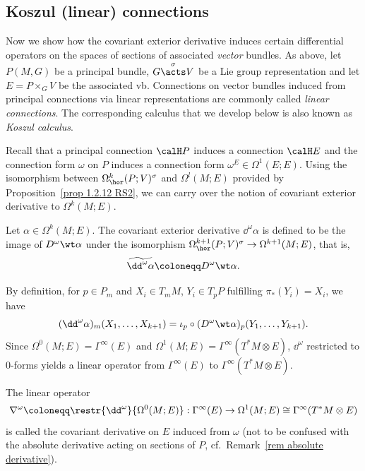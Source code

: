 \subsection{Koszul (linear) connections}

Now we show how the covariant exterior derivative induces certain differential operators on the spaces of sections of associated \emph{vector} bundles. As above, let $P(M,G)$ be a principal bundle, $G\overset{\sigma}{\acts}V$ be a Lie group representation and let $E=P\times_G V$ be the associated \gls{vb}. Connections on vector bundles induced from principal connections via linear representations are commonly called \emph{linear connections}. The corresponding calculus that we develop below is also known as \emph{Koszul calculus}.

Recall that a principal connection $\calH P$ induces a connection $\calH E$ and the connection form $\omega$ on $P$ induces a connection form $\omega^E\in \Omega^1(E;E)$. Using the isomorphism between $\Omega^k_{\hor}(P;V)^\sigma$ and $\Omega^l(M;E)$ provided by Proposition~\ref{prop 1.2.12 RS2}, we can carry over the notion of covariant exterior derivative to $\Omega^k(M;E)$.

\begin{defn}
    Let $\alpha\in\Omega^k(M;E)$. The covariant exterior derivative $\dd^\omega\alpha$ is defined to be the image of $D^\omega\wt\alpha$ under the isomorphism $\Omega^{k+1}_{\hor}(P;V)^\sigma\to \Omega^{k+1}(M;E)$, that is,
    \[\widetilde{\dd^\omega\alpha}\coloneqq D^\omega\wt\alpha.\]
\end{defn}

By definition, for $p\in P_m$ and $X_i\in T_mM$, $Y_i\in T_pP$ fulfilling $\pi_\ast(Y_i)=X_i$, we have
\[(\dd^\omega\alpha)_m(X_1,\ldots,X_{k+1})=\iota_p\circ(D^\omega\wt\alpha)_p(Y_1,\ldots,Y_{k+1}).\label{eq 1.5.2 RS2}\]
Since $\Omega^0(M;E)=\Gamma^\infty(E)$ and $\Omega^1(M;E)=\Gamma^\infty(T^\ast M\otimes E)$, $\dd^\omega$ restricted to $0$-forms yields a linear operator from $\Gamma^\infty(E)$ to $\Gamma^\infty(T^\ast M\otimes E)$.

\begin{defn}
    The linear operator
    \[\nabla^\omega\coloneqq \restr{\dd^\omega}{\Omega^0(M;E)}:\Gamma^\infty(E)\to \Omega^1(M;E)\cong\Gamma^\infty(T^\ast M\otimes E)\]
    is called the covariant derivative on $E$ induced from $\omega$ (not to be confused with the absolute derivative acting on sections of $P$, cf.\ Remark~\ref{rem absolute derivative}). 
\end{defn}

